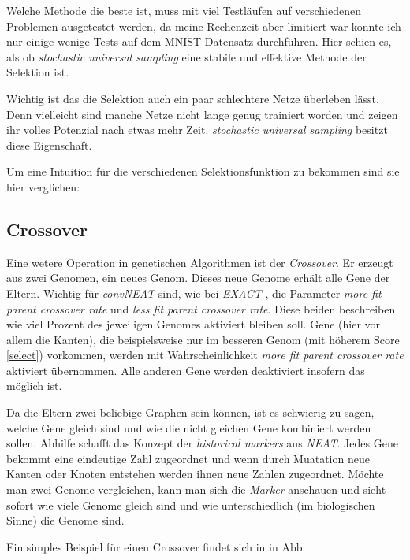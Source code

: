 \documentclass[]{scrartcl}
\begin{document}
			Welche Methode die beste ist, muss mit viel Testläufen auf verschiedenen Problemen ausgetestet werden, da meine Rechenzeit aber limitiert war konnte
			ich nur einige wenige Tests auf dem MNIST Datensatz durchführen. Hier schien es, als ob \textit{stochastic universal sampling}
			eine stabile und effektive Methode der Selektion ist.

			Wichtig ist das die Selektion auch ein paar schlechtere Netze überleben lässt. Denn vielleicht sind manche Netze nicht lange genug trainiert worden
			und zeigen ihr volles Potenzial nach etwas mehr Zeit. \textit{stochastic universal sampling} besitzt diese Eigenschaft.

			Um eine Intuition für die verschiedenen Selektionsfunktion zu bekommen sind sie hier verglichen:

		
		\subsection{Crossover}

			Eine wetere Operation in genetischen Algorithmen ist der \textit{Crossover}. Er erzeugt aus zwei Genomen, ein neues Genom.
			Dieses neue Genome erhält alle Gene der Eltern. Wichtig für \textit{convNEAT} sind, wie bei \textit{EXACT} \cite{exact},
			die Parameter \textit{more fit parent crossover rate} und \textit{less fit parent crossover rate}.
			Diese beiden beschreiben wie viel Prozent des jeweiligen Genomes aktiviert bleiben soll.
			Gene (hier vor allem die Kanten), die beispielsweise nur im besseren Genom (mit höherem Score \ref{select}) vorkommen,
			werden mit Wahrscheinlichkeit \textit{more fit parent crossover rate} aktiviert übernommen.
			Alle anderen Gene werden deaktiviert insofern das möglich ist.

			Da die Eltern zwei beliebige Graphen sein können, ist es schwierig zu sagen, welche Gene gleich sind und wie die nicht gleichen Gene kombiniert werden sollen.
			Abhilfe schafft das Konzept der \textit{historical markers} aus \textit{NEAT}. Jedes Gene bekommt eine eindeutige Zahl zugeordnet und wenn durch
			Muatation neue Kanten oder Knoten entstehen werden ihnen neue Zahlen zugeordnet.
			Möchte man zwei Genome vergleichen, kann man sich die \textit{Marker} anschauen und sieht sofort wie viele Genome gleich sind und wie
			unterschiedlich (im biologischen Sinne) die Genome sind.

			Ein simples Beispiel für einen Crossover findet sich in in Abb. 
\end{document}
